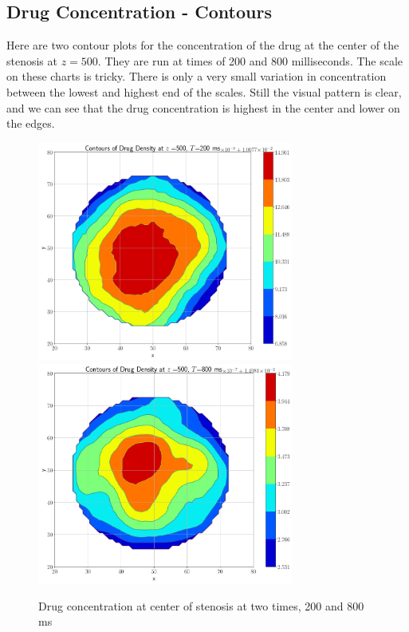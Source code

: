 \documentclass[11pt]{article} %
\begin{document}
\subsection{Drug Concentration - Contours}
Here are two contour plots for the concentration of the drug at the center of the stenosis
at $z=500$.  They are run at times of 200 and 800 milliseconds.
The scale on these charts is tricky.  
There is only a very small variation in concentration between the lowest and highest end of the scales.  
Still the visual pattern is clear, and we can see that the drug concentration is highest in the
center and lower on the edges.
\begin{figure}[h!]
\centering
\hspace*{-0.25in}
\vspace*{-0.50in}
\includegraphics[width=0.75\textwidth]{contour_drug/contour_drug_z_500_t_200.png}
\includegraphics[width=0.75\textwidth]{contour_drug/contour_drug_z_500_t_800.png}
\caption{Drug concentration at center of stenosis at two times, 200 and 800 ms}
\end{figure}
\end{document}
